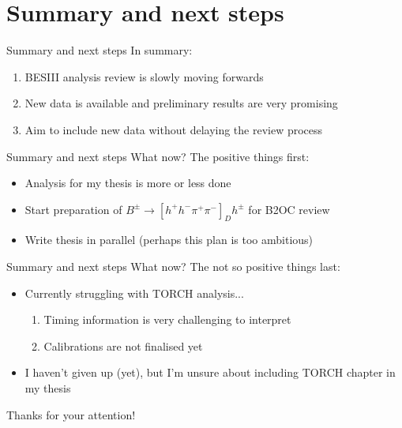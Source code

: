 \documentclass{beamer}
\begin{document}
\section{Summary and next steps}

\begin{frame}{Summary and next steps}
  \vspace{0.0cm}
  {\Large In summary:}
  \vspace{0.5cm}
  \begin{enumerate}
    \setlength\itemsep{1.0em}
    \item{BESIII analysis review is slowly moving forwards}
    \item{New data is available and preliminary results are very promising}
    \item{Aim to include new data without delaying the review process}
  \end{enumerate}
\end{frame}

\begin{frame}{Summary and next steps}
  \vspace{1.0cm}
  {\Large What now? The positive things first:}
  \vspace{0.5cm}
  \begin{itemize}
    \setlength\itemsep{1.0em}
    \item{Analysis for my thesis is more or less done}
    \item{Start preparation of $B^\pm\to[h^+h^-\pi^+\pi^-]_Dh^\pm$ for B2OC review}
    \item{Write thesis in parallel (perhaps this plan is too ambitious)}
  \end{itemize}
\end{frame}

\begin{frame}{Summary and next steps}
  \vspace{1.0cm}
  {\Large What now? The not so positive things last:}
  \vspace{0.5cm}
  \begin{itemize}
    \setlength\itemsep{1.0em}
    \item{Currently struggling with TORCH analysis...}
    \begin{enumerate}
      \item{Timing information is very challenging to interpret}
      \item{Calibrations are not finalised yet}
    \end{enumerate}
    \item{I haven't given up (yet), but I'm unsure about including TORCH chapter in my thesis}
  \end{itemize}
  \vspace{0.2cm}
  \begin{center}
    {\Large Thanks for your attention!}
  \end{center}
\end{frame}
\end{document}
